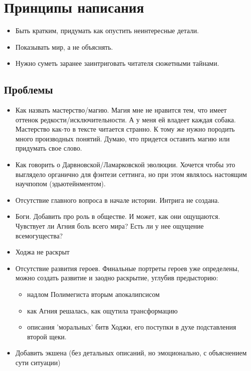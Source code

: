 \documentclass[12pt,a4paper]{article}
\begin{document}
\section*{Принципы написания}
\begin{itemize}
	\item Быть кратким, придумать как опустить неинтересные детали.
	\item Показывать мир, а не объяснять.
	\item Нужно суметь заранее заинтриговать читателя сюжетными тайнами.
\end{itemize}

\subsection*{Проблемы}
\begin{itemize}
	\item Как назвать мастерство/магию. Магия мне не нравится тем, что имеет оттенок редкости/исключительности. А у меня ей владеет каждая собака. Мастерство как-то в тексте читается странно. К тому же нужно породить много производных понятий. Думаю, что придется оставить магию или придумать свое слово.
	\item Как говорить о Дарвновской/Ламарковской эволюции. Хочется чтобы это выглядело органично для фэнтези сеттинга, но при этом являлось настоящим научпопом (эдьютейнментом).
	\item Отсутствие главного вопроса в начале истории. Интрига не создана.
	\item Боги. Добавить про роль в обществе. И может, как они ощущаются. Чувствует ли Агния боль всего мира? Есть ли у нее ощущение всемогущества?
	\item Ходжа не раскрыт
	\item Отсутствие развития героев. Финальные портреты героев уже определены, можно создать развитие и заодно раскрытие, углубив предысторию:
	\begin{itemize}
		\item надлом Полимегиста вторым апокалипсисом
		\item как Агния решалась, как ощутила трансформацию
		\item описания 'моральных' битв Ходжи, его поступки в духе подставления второй щеки.
	\end{itemize}
	\item Добавить экшена (без детальных описаний, но эмоционально, с объяснением сути ситуации)
\end{itemize}
\end{document}

